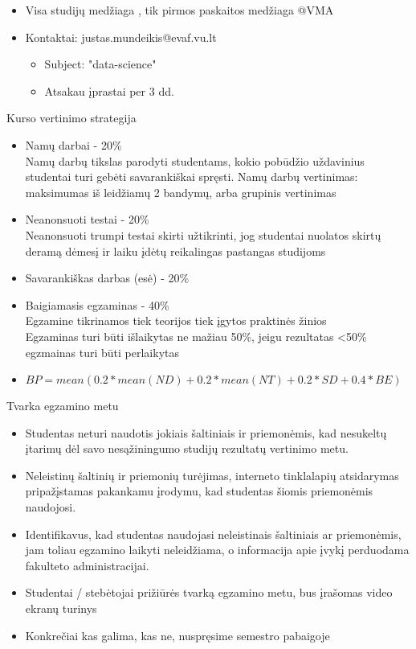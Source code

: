 \documentclass[11pt,xcolor=table]{beamer}
\begin{document}
\begin{frame}
\begin{itemize}
\item Visa studijų medžiaga \href{https://github.com/justasmundeikis/duomenu_analizes_ivadas}{\color{blue}{Github}}, tik pirmos paskaitos medžiaga @VMA
\item Kontaktai: justas.mundeikis@evaf.vu.lt
\begin{itemize}
\item Subject: "data-science"
\item Atsakau įprastai per 3 dd.
\end{itemize}
\end{itemize}
\end{frame}

\begin{frame}{Kurso vertinimo strategija}

\begin{itemize}
\item Namų darbai - 20\%
\\Namų darbų tikslas parodyti studentams, kokio pobūdžio uždavinius studentai turi gebėti savarankiškai spręsti. Namų darbų vertinimas: maksimumas iš leidžiamų 2 bandymų, arba grupinis vertinimas
\item Neanonsuoti testai - 20\%
\\Neanonsuoti trumpi testai skirti užtikrinti, jog studentai nuolatos skirtų deramą dėmesį ir laiku įdėtų reikalingas pastangas studijoms
\item Savarankiškas darbas (esė) - 20\%
\item Baigiamasis egzaminas - 40\% 
\\Egzamine tikrinamos tiek teorijos tiek įgytos praktinės žinios 
\\Egzaminas turi būti išlaikytas ne mažiau 50\%, jeigu rezultatas <50\% egzmainas turi būti perlaikytas
\item $BP=mean(0.2*mean(ND)+0.2*mean(NT)+0.2*SD +0.4*BE)$
\end{itemize}
\end{frame}

\begin{frame}{Tvarka egzamino metu}
\begin{itemize}
\item Studentas neturi naudotis jokiais šaltiniais ir
priemonėmis, kad nesukeltų įtarimų dėl savo
nesąžiningumo studijų rezultatų vertinimo metu.
\item  Neleistinų šaltinių ir priemonių turėjimas, interneto
tinklalapių atsidarymas pripažįstamas pakankamu
įrodymu, kad studentas šiomis priemonėmis
naudojosi.
\item  Identifikavus, kad studentas naudojasi neleistinais
šaltiniais ar priemonėmis, jam toliau egzamino laikyti
neleidžiama, o informacija apie įvykį perduodama
fakulteto administracijai.
\item Studentai / stebėtojai prižiūrės tvarką egzamino
metu, bus įrašomas video ekranų turinys
\item Konkrečiai kas galima, kas ne, nuspręsime semestro pabaigoje
\end{itemize}
\end{frame}
\end{document}
